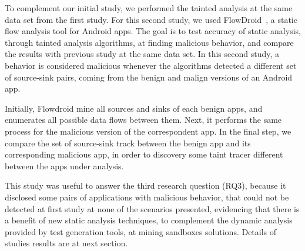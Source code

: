 To complement our initial study, we performed the tainted analysis at the same
data set from the first study. For this second study, we used
FlowDroid~\cite{10.1145/2666356.2594299}, a static flow analysis tool for Android apps.
The goal is to test accuracy of static analysis, through tainted analysis algorithms, at finding malicious behavior, and compare the results with previous study at the same data set.
In this second study, a behavior is considered malicious whenever the algorithms
detected a different set of source-sink pairs, coming from the benign and malign
versions of an Android app. 

Initially, Flowdroid mine all sources and sinks of each benign apps, and enumerates all possible data flows between them. Next, it performs the same process for the malicious version
of the correspondent app. In the final step, we compare the set of source-sink track between the benign app and its corresponding malicious app, in order to discovery some taint tracer different between the apps under analysis.

This study was useful to answer the third research question (RQ3), because it disclosed some pairs of applications with malicious behavior, that could not be detected at first study at none of the scenarios presented, evidencing that there is a benefit of new static analysis techniques, to complement the dynamic analysis provided by test generation tools, at mining sandboxes solutions. Details of studies results are at next section.





